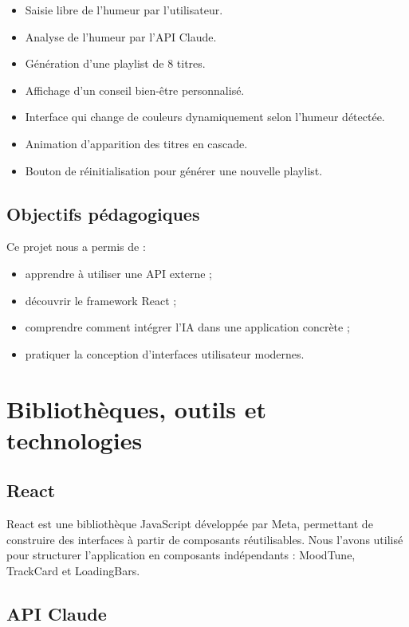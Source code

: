 \documentclass[a4paper, 12pt, twoside]{article}
\begin{document}
\begin{itemize}
    \item Saisie libre de l'humeur par l'utilisateur.
    \item Analyse de l'humeur par l'API Claude.
    \item Génération d'une playlist de 8 titres.
    \item Affichage d'un conseil bien-être personnalisé.
    \item Interface qui change de couleurs dynamiquement selon l'humeur détectée.
    \item Animation d'apparition des titres en cascade.
    \item Bouton de réinitialisation pour générer une nouvelle playlist.
\end{itemize}

\subsection{Objectifs pédagogiques}

Ce projet nous a permis de :

\begin{itemize}
    \item apprendre à utiliser une API externe ;
    \item découvrir le framework React ;
    \item comprendre comment intégrer l'IA dans une application concrète ;
    \item pratiquer la conception d'interfaces utilisateur modernes.
\end{itemize}

\section{Bibliothèques, outils et technologies}

\subsection{React}

React est une bibliothèque JavaScript développée par Meta, permettant de construire des interfaces à partir de composants réutilisables. Nous l'avons utilisé pour structurer l'application en composants indépendants : MoodTune, TrackCard et LoadingBars.

\subsection{API Claude}
\end{document}
